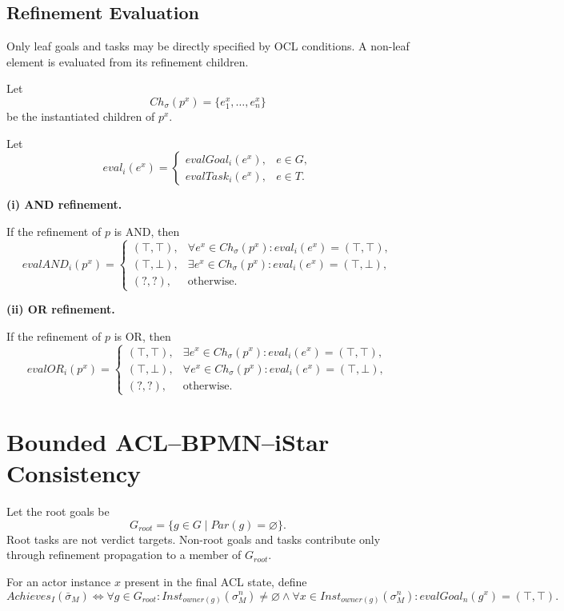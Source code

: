 \documentclass[11pt,a4paper]{article}
\newcommand{\Par}{\mathit{Par}}
\newcommand{\Ch}{\mathit{Ch}}
\begin{document}
\subsection{Refinement Evaluation}

Only leaf goals and tasks may be directly specified by OCL conditions.
A non-leaf element is evaluated from its refinement children.

Let
\[
\Ch_{\sigma}(p^x)
=
\{
e_1^x,\ldots,e_n^x
\}
\]
be the instantiated children of \(p^x\).

Let
\[
eval_i(e^x)
=
\begin{cases}
evalGoal_i(e^x),
&
e\in G,
\\
evalTask_i(e^x),
&
e\in T.
\end{cases}
\]

\medskip
\noindent
\textbf{(i) AND refinement.}

If the refinement of \(p\) is AND, then
\[
evalAND_i(p^x)
=
\begin{cases}
(\top,\top),
&
\forall e^x\in\Ch_{\sigma}(p^x):
eval_i(e^x)=(\top,\top),
\\[1mm]
(\top,\bot),
&
\exists e^x\in\Ch_{\sigma}(p^x):
eval_i(e^x)=(\top,\bot),
\\[1mm]
(?,?),
&
\text{otherwise}.
\end{cases}
\]

\medskip
\noindent
\textbf{(ii) OR refinement.}

If the refinement of \(p\) is OR, then
\[
evalOR_i(p^x)
=
\begin{cases}
(\top,\top),
&
\exists e^x\in\Ch_{\sigma}(p^x):
eval_i(e^x)=(\top,\top),
\\[1mm]
(\top,\bot),
&
\forall e^x\in\Ch_{\sigma}(p^x):
eval_i(e^x)=(\top,\bot),
\\[1mm]
(?,?),
&
\text{otherwise}.
\end{cases}
\]

\section{Bounded ACL--BPMN--iStar Consistency}

Let the root goals be
\[
G_{root}
=
\{g\in G\mid\Par(g)=\varnothing\}.
\]
Root tasks are not verdict targets.  Non-root goals and tasks contribute only
through refinement propagation to a member of $G_{root}$.

For an actor instance $x$ present in the final ACL state, define
\[
Achieves_I(\bar{\sigma}_M)
\Longleftrightarrow
\forall g\in G_{root}:
Inst_{owner(g)}(\sigma_M^n)\neq\varnothing
\land
\forall x\in Inst_{owner(g)}(\sigma_M^n):
evalGoal_n(g^x)=(\top,\top).
\]
\end{document}
